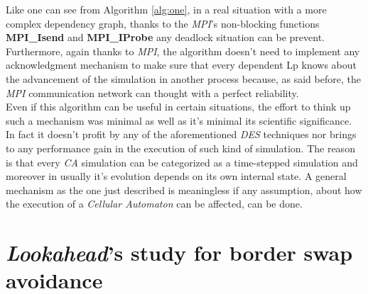 \documentclass[12pt,a4paper,fleqn]{report}
\begin{document}
Like one can see from Algorithm \ref{alg:one}, in a real situation with a more complex dependency graph, thanks to the \textit{MPI}'s non-blocking functions \textbf{MPI\_Isend} and \textbf{MPI\_IProbe} any deadlock situation can be prevent. Furthermore, again thanks to \textit{MPI}, the algorithm doesn't need to implement any acknowledgment mechanism to make sure that every dependent Lp knows about the advancement of the simulation in another process because, as said before, the \textit{MPI} communication network can thought with a perfect reliability. \\
Even if this algorithm can be useful in certain situations, the effort to think up such a mechanism was minimal as well as it's minimal its scientific significance. In fact it doesn't profit by any of the aforementioned \textit{DES} techniques nor brings to any performance gain in the execution of such kind of simulation. The reason is that every \textit{CA} simulation can be categorized as a time-stepped simulation and moreover in usually it's evolution depends on its own internal state. A general mechanism as the one just described is meaningless if any assumption, about how the execution of a \textit{Cellular Automaton} can be affected, can be done. 
\section{\textit{Lookahead}'s study for border swap avoidance}
\end{document}
